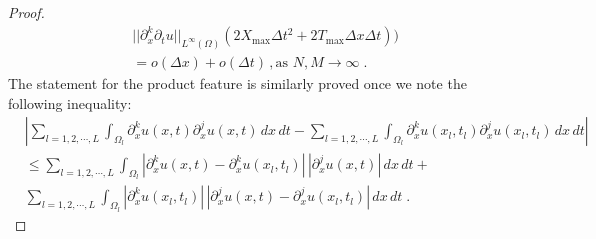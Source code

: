 \documentclass[a4paper,11pt]{article}
\begin{document}
\begin{proof}
\begin{align*}
&||\partial_x^{k}\partial_tu||_{L^\infty(\Omega)}(2X_{\max}\Delta t^2+2T_{\max}\Delta x\Delta t))\\
&=o(\Delta x)+o(\Delta t)\,,\text{as~}N,M\to\infty\;.
\end{align*}
The statement for the product feature is similarly proved once we note the following inequality:
\begin{align*}
&|\sum_{l=1,2,\cdots,L}\int_{\Omega_l}\partial_x^ku(x,t)\partial_x^ju(x,t)\,dx\,dt-\sum_{l=1,2,\cdots,L}\int_{\Omega_l}\partial_x^ku(x_l,t_l)\partial_x^ju(x_l,t_l)\,dx\,dt|\\
&\leq\sum_{l=1,2,\cdots,L}\int_{\Omega_l}|\partial_x^ku(x,t)-\partial_x^ku(x_l,t_l)|\,|\partial_x^ju(x,t)|\,dx\,dt+\\
&\sum_{l=1,2,\cdots,L}\int_{\Omega_l}|\partial_x^ku(x_l,t_l)|\,|\partial_x^ju(x,t)-\partial_x^ju(x_l,t_l)|\,dx\,dt\;.
\end{align*}
\end{proof}



%
%
\end{document}

